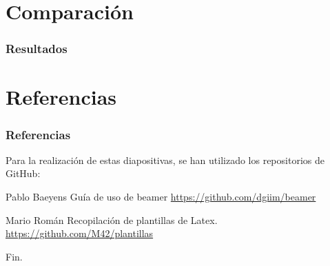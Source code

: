 \documentclass[12pt, aspectratio=169]{beamer} %
\begin{document}
\section{Comparación}
	\begin{frame}
		\frametitle{Resultados}
	

%			
%
%			
%
%			
	
	\end{frame}

\section{Referencias}
	\begin{frame}
		\frametitle{Referencias}
		
		Para la realización de estas diapositivas, se han utilizado los repositorios de GitHub:
		
		\footnotesize{
		  \begin{thebibliography}{7} %
		     Pablo Baeyens
		      \newblock Guía de uso de beamer
		      \newblock \url{https://github.com/dgiim/beamer}
		      
		     Mario Román
		      \newblock Recopilación de plantillas de Latex.
		      \newblock \url{https://github.com/M42/plantillas}
		  \end{thebibliography}
		}
	\end{frame}


\begin{frame}
\Huge{\centerline{Fin.}}
\end{frame}

\end{document}
